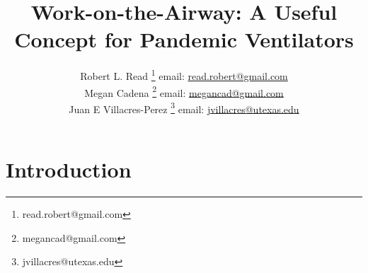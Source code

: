 \documentclass{article}
\title{Work-on-the-Airway: A Useful Concept for Pandemic Ventilators}
\author{Robert L. Read
  \thanks{read.robert@gmail.com}
  email: \href{mailto:read.robert@gmail.com}{read.robert@gmail.com}\\
Megan Cadena
  \thanks{megancad@gmail.com}
  email: \href{mailto:megancad@gmail.com}{megancad@gmail.com}\\
  Juan E Villacres-Perez
  \thanks{jvillacres@utexas.edu}
  email: \href{mailto:jvillacres@utexas.edu}{jvillacres@utexas.edu}
  }
\begin{document}
\maketitle
\begin{abstract}

\end{abstract}


\section{Introduction}

\cite{mitpowercalculation}





\end{document}
